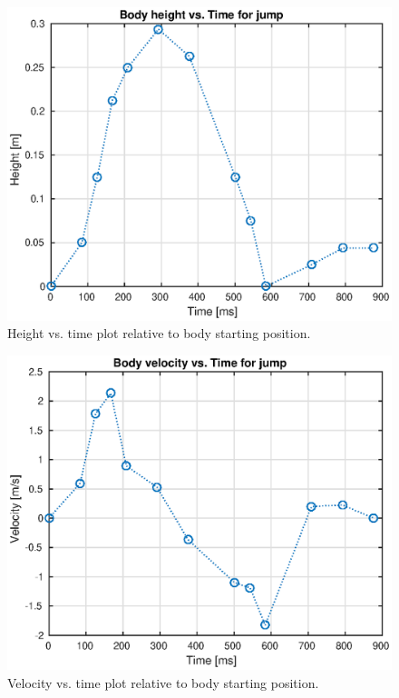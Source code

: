 \begin{figure}
\centering
\includegraphics[width=1\textwidth]{images/experiments/jump/height-vs-time.eps} 
\caption{Height vs. time plot relative to body starting position.}
\label{fig:height-time-jump}
\end{figure}

\begin{figure}
\centering
\includegraphics[width=1\textwidth]{images/experiments/jump/velocity-vs-time.eps} 
\caption{Velocity vs. time plot relative to body starting position.}
\label{fig:velocity-time-jump}
\end{figure}

